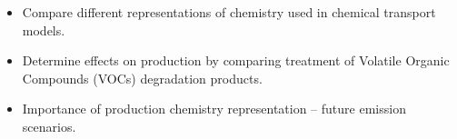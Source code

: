 \begin{BlueBox}
    \vskip-1cm
    \begin{block}{}
        \begin{itemize}
            \item Compare different representations of  chemistry used in chemical transport models. \vspace{5mm}
            \item Determine effects on  production by comparing treatment of Volatile Organic Compounds (VOCs) degradation products. \vspace{0.2mm}
            \item Importance of  production chemistry representation -- future emission scenarios.
        \end{itemize}
    \end{block}
\end{BlueBox}
